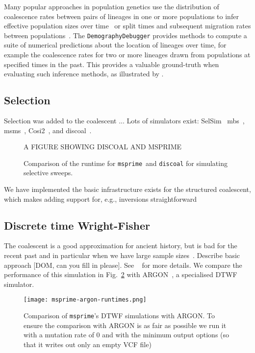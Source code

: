 \documentclass{article}
\newcommand{\msprime}[0]{\texttt{msprime}}
\begin{document}
Many popular approaches in population genetics use the distribution of
coalescence rates between pairs of lineages in one or more populations to infer
effective population sizes over
time~\citep{li2011inference,sheehan2013estimating,schiffels2014inferring} or
split times and subsequent migration rates between
populations~\citep{wang2020tracking}. The \texttt{DemographyDebugger} provides
methods to compute a suite of numerical predictions about the location of
lineages over time, for example the coalescence rates for two or more lineages
drawn from populations at specified times in the past. This provides a valuable
ground-truth when evaluating such inference methods, as illustrated by
\cite{adrion2020community}.

\subsection*{Selection}
Selection was added to the coalescent ... Lots of simulators exist:
SelSim~\citep{spencer2004selsim}
mbs~\citep{teshima2009mbs},
msms~\citep{ewing2010msms},
Cosi2~\citep{shlyakhter2014cosi2},
and discoal~\citep{kern2016discoal}.

\begin{figure}
\Large{A FIGURE SHOWING DISCOAL AND MSPRIME}
\caption{\label{fig-selection-perf}Comparison of the runtime for
\msprime\ and \texttt{discoal} for simulating selective sweeps.
}
\end{figure}

We have implemented the basic infrastructure exists for the structured
coalescent, which makes adding support for, e.g.,
inversions straightforward~\citep{peischl2013sequential}

\subsection*{Discrete time Wright-Fisher}
The coalescent is a good approximation for ancient history, but
is bad for the recent past and in particular when we have large
sample
sizes~\citep{wakeley2012gene,bhaskar2014distortion,nelson2020accounting}.
Describe basic
approach [DOM, can you fill in please].
See ~\cite{nelson2020accounting} for more details.
We compare the performance of this simulation in Fig.~\ref{fig-dtwf-perf}
with ARGON~\citep{palamara2016argon}, a specialised DTWF simulator.

\begin{figure}
\begin{center}
\texttt{[image: msprime-argon-runtimes.png]}
\end{center}
\caption{\label{fig-dtwf-perf} Comparison of \msprime's DTWF
simulations with ARGON. To ensure the comparison with ARGON is
as fair as possible we run it with a mutation rate of 0 and with
the minimum output options (so that it writes out only an empty VCF file)}
\end{figure}
\end{document}
